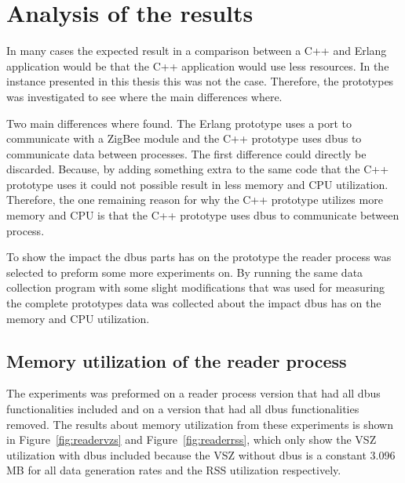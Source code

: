 \section{Analysis of the results}
In many cases the expected result in a comparison between a C++ and Erlang application would be that the C++ application would use less resources. In the instance presented in this thesis this was not the case. Therefore, the prototypes was investigated to see where the main differences where. 

Two main differences where found. The Erlang prototype uses a port to communicate with a ZigBee module and the C++ prototype uses dbus to communicate data between processes. The first difference could directly be discarded. Because, by adding something extra to the same code that the C++ prototype uses it could not possible result in less memory and CPU utilization. Therefore, the one remaining reason for why the C++ prototype utilizes more memory and CPU is that the C++ prototype uses dbus to communicate between process. 

To show the impact the dbus parts has on the prototype the reader process was selected to preform some more experiments on. By running the same data collection program with some slight modifications that was used for measuring the complete prototypes data was collected about the impact dbus has on the memory and CPU utilization.   

\subsection{Memory utilization of the reader process}
The experiments was preformed on a reader process version that had all dbus functionalities included and on a version that had all dbus functionalities removed. The results about memory utilization from these experiments is shown in Figure~\ref{fig:readervzs} and Figure~\ref{fig:readerrss}, which only show the VSZ utilization with dbus included because the VSZ without dbus is a constant 3.096 MB for all data generation rates and the RSS utilization respectively. 

